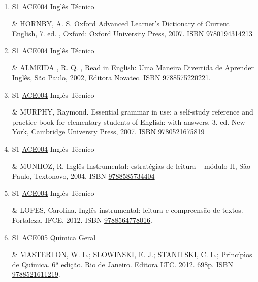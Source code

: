 \documentclass[12pt,a4paper]{book}
\begin{document}
\begin{enumerate}
 \item S1 \hyperref[PUD:ACE004]{ACE004} Inglês Técnico

&  HORNBY, A.  S.  Oxford Advanced Learner’s Dictionary of Current English, 7.  ed. , Oxford: Oxford University Press, 2007.  ISBN \href{http://www.isbnsearch.org/isbn/9780194314213}{9780194314213}
 

 \item S1 \hyperref[PUD:ACE004]{ACE004} Inglês Técnico

&  ALMEIDA , R.  Q.  , Read in English: Uma Maneira Divertida de Aprender Inglês, São Paulo, 2002, Editora Novatec.  ISBN \href{http://www.bn.br/site/pages/servicosProfissionais/agenciaISBN/isbnBusca/FbnBuscaISBNCatalogo.asp?pField=ISBN&pIntPagina=1&pISBN=75220221&nidbISBN=true&hidbISBN=true}{9788575220221}.
 \item S1 \hyperref[PUD:ACE004]{ACE004} Inglês Técnico

&  MURPHY, Raymond.  Essential grammar in use: a self-study reference and practice book for elementary students of English: with answers.  3.  ed.  New York, Cambridge Universty Press, 2007.  ISBN \href{http://www.isbnsearch.org/isbn/9780521675819}{9780521675819} 
 

 \item S1 \hyperref[PUD:ACE004]{ACE004} Inglês Técnico

&  MUNHOZ, R.  Inglês Instrumental: estratégias de leitura – módulo II, São Paulo, Textonovo, 2004.  ISBN \href{http://www.bn.br/site/pages/servicosProfissionais/agenciaISBN/isbnBusca/FbnBuscaISBNCatalogo.asp?pField=ISBN&pIntPagina=1&pISBN=85734404&nidbISBN=true&hidbISBN=true}{9788585734404}
 

 \item S1 \hyperref[PUD:ACE004]{ACE004} Inglês Técnico

&  LOPES, Carolina.  Inglês instrumental: leitura e compreensão de textos.  Fortaleza, IFCE, 2012.  ISBN \href{http://www.bn.br/site/pages/servicosProfissionais/agenciaISBN/isbnBusca/FbnBuscaISBNCatalogo.asp?pField=ISBN&pIntPagina=1&pISBN=64778016&nidbISBN=true&hidbISBN=true}{9788564778016}.
 \item S1 \hyperref[PUD:ACE005]{ACE005} Química Geral

&  MASTERTON, W.  L.;  SLOWINSKI, E.  J.;  STANITSKI, C.  L.;  Princípios de Química.  6ª edição.  Rio de Janeiro.  Editora LTC.  2012.  698p.  ISBN \href{http://www.bn.br/site/pages/servicosProfissionais/agenciaISBN/isbnBusca/FbnBuscaISBNCatalogo.asp?pField=ISBN&pIntPagina=1&pISBN=21611219&nidbISBN=true&hidbISBN=true}{9788521611219}. 
 


\end{enumerate}
\end{document}
